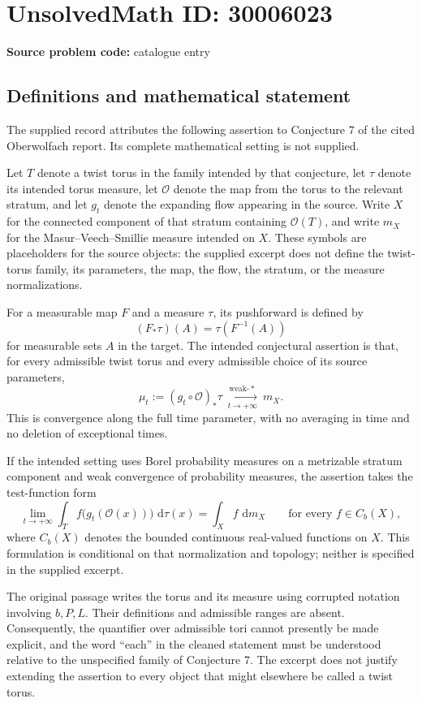 \documentclass[11pt]{article}
\newcommand{\dd}{\,\mathrm{d}}
\begin{document}
\section*{UnsolvedMath ID: 30006023}
\textbf{Source problem code:} catalogue entry
\subsection{Definitions and mathematical statement}
The supplied record attributes the following assertion to Conjecture 7 of the cited Oberwolfach report. Its complete mathematical setting is not supplied.

Let \(T\) denote a twist torus in the family intended by that conjecture, let \(\tau\) denote its intended torus measure, let \(\mathcal O\) denote the map from the torus to the relevant stratum, and let \(g_t\) denote the expanding flow appearing in the source. Write \(X\) for the connected component of that stratum containing \(\mathcal O(T)\), and write \(m_X\) for the Masur--Veech--Smillie measure intended on \(X\). These symbols are placeholders for the source objects: the supplied excerpt does not define the twist-torus family, its parameters, the map, the flow, the stratum, or the measure normalizations.

For a measurable map \(F\) and a measure \(\tau\), its pushforward is defined by
\[
(F_*\tau)(A)=\tau(F^{-1}(A))
\]
for measurable sets \(A\) in the target. The intended conjectural assertion is that, for every admissible twist torus and every admissible choice of its source parameters,
\[
\mu_t:=(g_t\circ\mathcal O)_*\tau
\ \xrightarrow[t\to+\infty]{\mathrm{weak}\text{-}*}\ m_X.
\]
This is convergence along the full time parameter, with no averaging in time and no deletion of exceptional times.

If the intended setting uses Borel probability measures on a metrizable stratum component and weak convergence of probability measures, the assertion takes the test-function form
\[
\lim_{t\to+\infty}\int_T f\bigl(g_t(\mathcal O(x))\bigr)\,\dd\tau(x)
=\int_X f\,\dd m_X
\qquad\text{for every }f\in C_b(X),
\]
where \(C_b(X)\) denotes the bounded continuous real-valued functions on \(X\). This formulation is conditional on that normalization and topology; neither is specified in the supplied excerpt.

The original passage writes the torus and its measure using corrupted notation involving \(b,P,L\). Their definitions and admissible ranges are absent. Consequently, the quantifier over admissible tori cannot presently be made explicit, and the word ``each'' in the cleaned statement must be understood relative to the unspecified family of Conjecture 7. The excerpt does not justify extending the assertion to every object that might elsewhere be called a twist torus.
\end{document}
